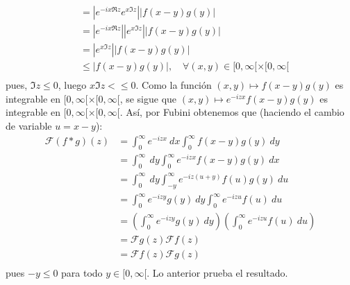 \documentclass[12pt]{report}
\newcounter{it}
\theoremstyle{largebreak}
\renewcommand{\leq}{\ensuremath{\leqslant}}
\newcommand\abs[1]{\ensuremath{\left|#1\right|}}
\newcommand{\fou}[1]{\ensuremath{\mathcal{F}#1}}
\begin{document}
\begin{sol}
\begin{equation*}
\begin{split}
                &=\abs{e^{ -ix\Re z}e^{x\Im z}}\abs{f(x-y)g(y)}\\
                &=\abs{e^{ -ix\Re z}}\abs{e^{x\Im z}}\abs{f(x-y)g(y)}\\
                &=\abs{e^{x\Im z}}\abs{f(x-y)g(y)}\\
                &\leq\abs{f(x-y)g(y)},\quad\forall (x,y)\in[0,\infty[\times[0,\infty[\\
            \end{split}
        \end{equation*}
        pues, $\Im z\leq 0$, luego $x\Im z<\leq0$. Como la función $(x,y)\mapsto f(x-y)g(y)$ es integrable en $[0,\infty[\times[0,\infty[$, se sigue que $(x,y)\mapsto e^{ -izx}f(x-y)g(y)$ es integrable en $[0,\infty[\times[0,\infty[$. Así, por Fubini obtenemos que (haciendo el cambio de variable $u=x-y$):
        \begin{equation*}
            \begin{split}
                \fou{(f*g)}(z)&=\int_0^{\infty}e^{ -izx}\:dx\int_{0}^{\infty}f(x-y)g(y)\:dy\\
                &=\int_0^{\infty}\:dy\int_{0}^{\infty}e^{-izx}f(x-y)g(y)\:dx\\
                &=\int_0^{\infty}\:dy\int_{-y}^{\infty}e^{-iz(u+y)}f(u)g(y)\:du\\
                &=\int_0^{\infty} e^{-izy}g(y)\:dy\int_{0}^{\infty}e^{-izu}f(u)\:du\\
                &=\left(\int_0^{\infty} e^{-izy}g(y)\:dy\right)\left(\int_{0}^{\infty}e^{-izu}f(u)\:du\right)\\
                &=\fou{g}(z)\fou{f}(z)\\
                &=\fou{f}(z)\fou{g}(z)\\
            \end{split}
        \end{equation*}
        pues $-y\leq0$ para todo $y\in[0,\infty[$. Lo anterior prueba el resultado.


\end{sol}
\end{document}
